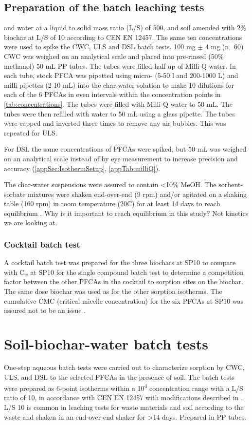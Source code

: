 \subsection{Preparation of the batch leaching tests}
and water at a liquid to solid mass ratio (L/S) of 500, and soil amended with 2\% biochar at L/S of 10 according to CEN EN 12457. 
The same ten concentrations were used to spike the CWC, ULS and DSL batch tests. 100 mg $\pm$ 4 mg (n=60) CWC was weighed on an analytical scale and placed into pre-rinsed (50\% methanol) 50 mL PP tubes. The tubes were filled half up of Milli-Q water. In each tube, stock PFCA was pipetted using micro- (5-50 {\textmu}l and 200-1000 {\textmu}L) and milli pipettes (2-10 mL) into the char-water solution to make 10 dilutions for each of the 6 PFCAs in even intervals within the concentration points in \cref{tab:concentrations}. The tubes were filled with Milli-Q water to 50 mL. The tubes were then refilled with water to 50 mL using a glass pipette. The tubes were capped and inverted three times to remove any air bubbles. This was repeated for ULS. 

For DSL the same concentrations of PFCAs were spiked, but 50 mL was weighed on an analytical scale instead of by eye measurement to increase precision and accuracy (\cref{appSec:IsothermSetup}, \cref{appTab:milliQ}).

The char-water suspensions were assured to contain \textless 10\% MeOH. The sorbent-sorbate mixtures were shaken end-over-end (9 rpm) and/or agitated on a shaking table (160 rpm) in room temperature (20\textdegree C) for at least 14 days to reach equilibrium \citep{higgins2006}. Why is it important to reach equilibrium in this study? Not kinetics we are looking at. 

\subsubsection{Cocktail batch test}
A cocktail batch test was prepared for the three biochars at SP10 to compare with C$_w$ at SP10 for the single compound batch test to determine a competition factor between the other PFCAs in the cocktail to sorption sites on the biochar. The same dose biochar was used as for the other sorption isotherms. The cumulative CMC (critical micelle concentration) for the six PFCAs at SP10 was assured not to be an issue \citep{bhhatarai2011}. 

\section{Soil-biochar-water batch tests}
One-step aqueous batch tests were carried out to characterize sorption by CWC, ULS, and DSL to the selected PFCAs in the presence of soil. The batch tests were prepared as 6-point isotherms within a 10\textsuperscript{4} concentration range with a L/S ratio of 10, in accordance with CEN EN 12457 with modifications described in \citep{Hale2017fire,Kupryianchyk2016a}. L/S 10  is common in leaching tests for waste materials and soil according to the waste and shaken in an end-over-end shaker for \textgreater 14 days. Prepared in PP tubes. 

